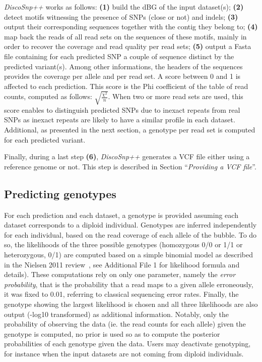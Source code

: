 \documentclass{bmcart}
\newcommand{\discopp}{{\it DiscoSnp++}\xspace}
\begin{document}
\discopp works as follows: \textbf{(1)} build the dBG of the input dataset(s);  \textbf{(2)} detect motifs witnessing the presence of SNPs (close or not) and indels; \textbf{(3)} output their corresponding sequences together with the contig they belong to; \textbf{(4)} map back the reads of all read sets on the sequences of these motifs, mainly in order to recover the coverage and read quality per read sets; \textbf{(5)} output a Fasta file containing for each predicted SNP a couple of sequence distinct by the predicted variant(s). Among other informations, the headers of the sequences provides the coverage per allele and per read set. 
A score between 0 and 1 is affected to each prediction. This score is the Phi coefficient of the table of read counts, computed as follows: $\sqrt{\frac{\chi^2}{n}}$. When two or more read sets are used, this score enables to distinguish predicted SNPs due to inexact repeats from real SNPs as inexact repeats are likely to have a similar profile in each dataset.  Additional, as presented in the next section, a genotype per read set is computed for each predicted variant. 

Finally, during a last step \textbf{(6)}, \discopp generates a VCF file either using a reference genome or not. This step is described in Section ``\emph{Providing a VCF file}''.



\subsection*{Predicting genotypes}
For each prediction and each dataset, a genotype is provided assuming each dataset corresponds to a diploid individual. Genotypes are inferred independently for each individual, based on the read coverage of each allele of the bubble. To do so, the likelihoods of the three possible genotypes (homozygous 0/0 or 1/1 or heterozygous, 0/1) are computed based on a simple binomial model as described in the Nielsen 2011 review~\cite{Nielsen2011}, see Additional File 1 for likelihood formula and details). These computations rely on only one parameter, namely the \emph{error probability}, that is the probability that a read maps to a given allele erroneously,
 it was fixed to 0.01, referring to classical sequencing error rates. Finally, the genotype showing the largest likelihood is chosen and all three likelihoods are also output (-log10 transformed) as additional information. Notably, only the probability of observing the data (ie. the read counts for each allele) given the genotype is computed, no prior is used so as to compute the posterior probabilities of each genotype given the data. Users may deactivate genotyping, for instance when the input datasets are not coming from diploid individuals.
\end{document}
